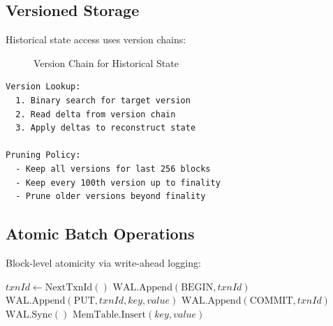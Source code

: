 \documentclass[11pt,a4paper]{article}
\begin{document}
\subsection{Versioned Storage}

Historical state access uses version chains:

\begin{figure}[htbp]
\centering
{}
\caption{Version Chain for Historical State}
\label{fig:versions}
\end{figure}

\begin{lstlisting}
Version Lookup:
  1. Binary search for target version
  2. Read delta from version chain
  3. Apply deltas to reconstruct state

Pruning Policy:
  - Keep all versions for last 256 blocks
  - Keep every 100th version up to finality
  - Prune older versions beyond finality
\end{lstlisting}

\subsection{Atomic Batch Operations}

Block-level atomicity via write-ahead logging:

\begin{algorithm}
\caption{Atomic Batch Write}
\begin{algorithmic}[1]
    \State $txnId \gets \text{NextTxnId}()$
    \State $\text{WAL}.\text{Append}(\text{BEGIN}, txnId)$
        \State $\text{WAL}.\text{Append}(\text{PUT}, txnId, key, value)$
    \EndFor
    \State $\text{WAL}.\text{Append}(\text{COMMIT}, txnId)$
    \State $\text{WAL}.\text{Sync}()$ 
        \State $\text{MemTable}.\text{Insert}(key, value)$
    \EndFor
\EndProcedure
\end{algorithmic}
\end{algorithm}
\end{document}
